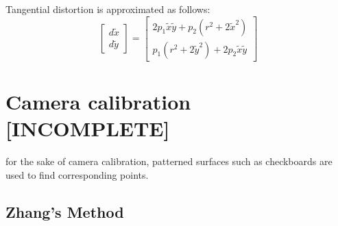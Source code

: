 \documentclass{article}
\begin{document}
Tangential distortion is approximated as follows:
\[
    \begin{bmatrix}
        d\tilde{x}\\ d\tilde{y} 
    \end{bmatrix} = \begin{bmatrix}
        2p_1\tilde{x}\tilde{y}+p_2(r^2+2\tilde{x}^2)\\
        p_1(r^2+2\tilde{y}^2)+2p_2\tilde{x}\tilde{y}
    \end{bmatrix}
\]
\section{Camera calibration [INCOMPLETE]}
for the sake of camera calibration, patterned surfaces such as checkboards are used to find corresponding points.
\subsection{Zhang's Method}
\end{document}
